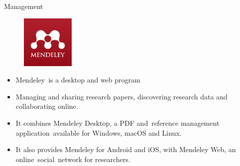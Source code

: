 \documentclass[
 size=14pt,
 paper=smartboard,  %
 mode=present, 		%
 display=slides, 	%
 style=tuliplab,  	%
 pauseslide,
 fleqn,leqno]{powerdot}{}
\begin{document}
\begin{slide}[toc=,bm=]{Management}

\begin{figure}
  \centering
  \includegraphics[width=1in]{figures/Mendeley_Logo.eps}\\
\end{figure}

\begin{itemize}
  \item Mendeley is a desktop and web program
  \item Managing and sharing research papers, discovering research data and collaborating online.
  \item It combines Mendeley Desktop, a PDF and reference management application available for Windows, macOS and Linux.
  \item It also provides Mendeley for Android and iOS, with Mendeley Web, an online social network for researchers.
\end{itemize}

\end{slide}
\end{document}
